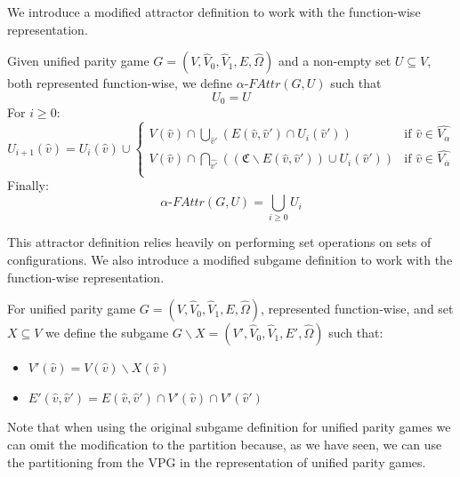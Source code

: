 We introduce a modified attractor definition to work with the function-wise representation.
\begin{definition}
		\label{def_Uattr}Given unified parity game $G = (V, \hat{V}_0,\hat{V}_1,E,\hat{\Omega})$ and a non-empty set $U \subseteq V$, both represented function-wise, we define $\alpha\textit{-FAttr}(G,U)$ such that
	\[U_0 = U \]
	For $i \geq 0$:
	\[
	U_{i+1}(\hat{v}) = U_i(\hat{v}) \cup \begin{cases}
V(\hat{v}) \cap \bigcup_{\hat{v}'} (E(\hat{v},\hat{v}') \cap U_i(\hat{v}')) & \text{if } \hat{v} \in \hat{V_{\alpha}}\\
V(\hat{v}) \cap \bigcap_{\hat{v'}}((\mathfrak{C} \backslash E(\hat{v},\hat{v}')) \cup U_i(\hat{v}')) & \text{if }\hat{v} \in  \hat{V_{\overline{\alpha}}} \\
	\end{cases}
	\]
	Finally:
	\[\alpha\textit{-FAttr}(G,U) = \bigcup_{i \geq 0} U_i \]
\end{definition}
This attractor definition relies heavily on performing set operations on sets of configurations. We also introduce a modified subgame definition to work with the function-wise representation.
\begin{definition}
	\label{def_Usubgame}
	For unified parity game $G = (V,\hat{V}_0,\hat{V}_1,E,\hat{\Omega})$, represented function-wise, and set $X \subseteq V$ we define the subgame $G \backslash X = (V',\hat{V}_0,\hat{V}_1,E',\hat{\Omega})$ such that:
	\begin{itemize}
		\item $V'(\hat{v}) = V(\hat{v}) \backslash X(\hat{v})$
		\item $E'(\hat{v},\hat{v}') = E(\hat{v},\hat{v}') \cap V'(\hat{v}) \cap V'(\hat{v}')$
	\end{itemize}
\end{definition}
Note that when using the original subgame definition for unified parity games we can omit the modification to the partition because, as we have seen, we can use the partitioning from the VPG in the representation of unified parity games.

